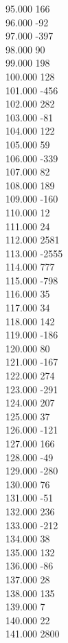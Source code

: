 { 95.000	166 \\
 96.000	-92 \\
 97.000	-397 \\
 98.000	90 \\
 99.000	198 \\
 100.000	128 \\
 101.000	-456 \\
 102.000	282 \\
 103.000	-81 \\
 104.000	122 \\
 105.000	59 \\
 106.000	-339 \\
 107.000	82 \\
 108.000	189 \\
 109.000	-160 \\
 110.000	12 \\
 111.000	24 \\
 112.000	2581 \\
 113.000	-2555 \\
 114.000	777 \\
 115.000	-798 \\
 116.000	35 \\
 117.000	34 \\
 118.000	142 \\
 119.000	-186 \\
 120.000	80 \\
 121.000	-167 \\
 122.000	274 \\
 123.000	-291 \\
 124.000	207 \\
 125.000	37 \\
 126.000	-121 \\
 127.000	166 \\
 128.000	-49 \\
 129.000	-280 \\
 130.000	76 \\
 131.000	-51 \\
 132.000	236 \\
 133.000	-212 \\
 134.000	38 \\
 135.000	132 \\
 136.000	-86 \\
 137.000	28 \\
 138.000	135 \\
 139.000	7 \\
 140.000	22 \\
 141.000	2800 \\
}
